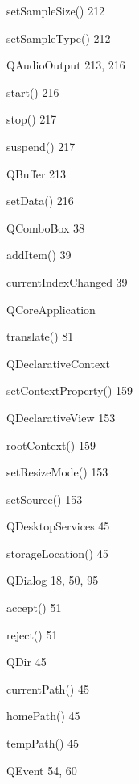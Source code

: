 \documentclass{book}
\renewcommand\subitem{\par}
\begin{document}
\begin{multicols}{2}
\begin{osp-index}
    \subitem setSampleSize()\hspace{1mm} 212
    \subitem setSampleType()\hspace{1mm} 212
  \item QAudioOutput\hspace{1mm} 213, 216
    \subitem start()\hspace{1mm} 216
    \subitem stop()\hspace{1mm} 217
    \subitem suspend()\hspace{1mm} 217
  \item QBuffer\hspace{1mm} 213
    \subitem setData()\hspace{1mm} 216
  \item QComboBox\hspace{1mm} 38
    \subitem addItem()\hspace{1mm} 39
    \subitem currentIndexChanged\hspace{1mm} 39
  \item QCoreApplication
    \subitem translate()\hspace{1mm} 81
  \item QDeclarativeContext
    \subitem setContextProperty()\hspace{1mm} 159
  \item QDeclarativeView\hspace{1mm} 153
    \subitem rootContext()\hspace{1mm} 159
    \subitem setResizeMode()\hspace{1mm} 153
    \subitem setSource()\hspace{1mm} 153
  \item QDesktopServices\hspace{1mm} 45
    \subitem storageLocation()\hspace{1mm} 45
  \item QDialog\hspace{1mm} 18, 50, 95
    \subitem accept()\hspace{1mm} 51
    \subitem reject()\hspace{1mm} 51
  \item QDir\hspace{1mm} 45
    \subitem currentPath()\hspace{1mm} 45
    \subitem homePath()\hspace{1mm} 45
    \subitem tempPath()\hspace{1mm} 45
  \item QEvent\hspace{1mm} 54, 60

\end{osp-index}
\end{multicols}
\end{document}
